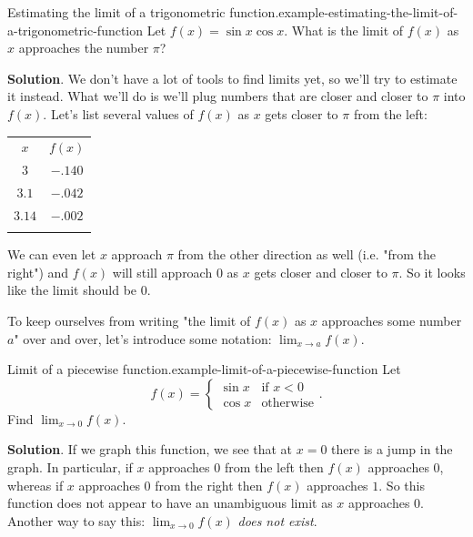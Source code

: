 \documentclass[10pt,]{book}
\numberwithin{equation}{section}
\newcommand{\hrulethin}  {\noalign{\hrule height 0.04em}}
\newcommand{\hrulethick} {\noalign{\hrule height 0.11em}}
\begin{document}
\begin{example}{Estimating the limit of a trigonometric function.}{example-estimating-the-limit-of-a-trigonometric-function}%
\hypertarget{p-6}{}%
Let \(f(x) = \sin x\cos x\). What is the limit of \(f(x)\) as \(x\) approaches the number \(\pi\)?%
\par\smallskip%
\noindent\textbf{Solution}.\hypertarget{solution-1}{}\quad%
\hypertarget{p-7}{}%
We don't have a lot of tools to find limits yet, so we'll try to estimate it instead. What we'll do is we'll plug numbers that are closer and closer to \(\pi\) into \(f(x)\). Let's list several values of \(f(x)\) as \(x\) gets closer to \(\pi\) from the left:%
\begin{table}
\centering
\begin{tabular}{cc}\hrulethick
\(x\)&\(f(x)\)\tabularnewline\hrulethin
\(3\)&\(-.140\)\tabularnewline[0pt]
\(3.1\)&\(-.042\)\tabularnewline[0pt]
\(3.14\)&\(-.002\)\tabularnewline\hrulethick
\end{tabular}
\end{table}
\hypertarget{p-8}{}%
We can even let \(x\) approach \(\pi\) from the other direction as well (i.e. "from the right") and \(f(x)\) will still approach \(0\) as \(x\) gets closer and closer to \(\pi\). So it looks like the limit should be \(0\).%
\end{example}
\hypertarget{p-9}{}%
To keep ourselves from writing "the limit of \(f(x)\) as \(x\) approaches some number \(a\)" over and over, let's introduce some notation: \(\lim_{x\to a}f(x)\).%
\begin{example}{Limit of a piecewise function.}{example-limit-of-a-piecewise-function}%
\hypertarget{p-10}{}%
Let%
%
\begin{equation*}
f(x) = \begin{cases} \sin x & \text{if $x<0$} \\ \cos x & \text{otherwise} \end{cases}.
\end{equation*}
\hypertarget{p-11}{}%
Find \(\lim_{x\to0}f(x)\).%
\par\smallskip%
\noindent\textbf{Solution}.\hypertarget{solution-2}{}\quad%
\hypertarget{p-12}{}%
If we graph this function, we see that at \(x=0\) there is a jump in the graph. In particular, if \(x\) approaches \(0\) from the left then \(f(x)\) approaches \(0\), whereas if \(x\) approaches \(0\) from the right then \(f(x)\) approaches \(1\). So this function does not appear to have an unambiguous limit as \(x\) approaches \(0\). Another way to say this: \(\lim_{x\to0}f(x)\) \emph{does not exist}.%
\end{example}
\end{document}
